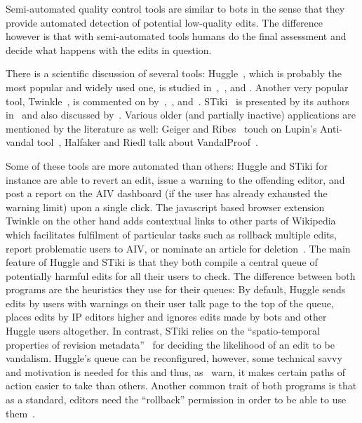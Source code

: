 Semi-automated quality control tools are similar to bots in the sense that they provide automated detection of potential low-quality edits.
The difference however is that with semi-automated tools humans do the final assessment and decide what happens with the edits in question.

There is a scientific discussion of several tools:
Huggle~\cite{Wikipedia:Huggle}, which is probably the most popular and widely used one, is studied in~\cite{GeiHal2013},~\cite{HalRied2012}, and \cite{GeiRib2010}.
Another very popular tool, Twinkle~\cite{Wikipedia:Twinkle}, is commented on by~\cite{GeiHal2013},~\cite{GeiRib2010}, and~\cite{HalGeiMorRied2013}.
STiki~\cite{Wikipedia:STiki} is presented by its authors in~\cite{WestKanLee2010} and also discussed by~\cite{GeiHal2013}.
Various older (and partially inactive) applications are mentioned by the literature as well:
Geiger and Ribes~\cite{GeiRib2010} touch on Lupin's Anti-vandal tool~\cite{Wikipedia:LupinAntiVandal},
Halfaker and Riedl talk about VandalProof~\cite{HalRied2012}.

Some of these tools are more automated than others: Huggle and STiki for instance are able to revert an edit, issue a warning to the offending editor, and post a report on the AIV dashboard (if the user has already exhausted the warning limit) upon a single click.
The javascript based browser extension Twinkle on the other hand adds contextual links to other parts of Wikipedia which facilitates fulfilment of particular tasks such as rollback multiple edits, report problematic users to AIV, or nominate an article for deletion~\cite{GeiRib2010}.
The main feature of Huggle and STiki is that they both compile a central queue of potentially harmful edits for all their users to check.
The difference between both programs are the heuristics they use for their queues:
By default, Huggle sends edits by users with warnings on their user talk page to the top of the queue, places edits by IP editors higher and ignores edits made by bots and other Huggle users altogether\cite{GeiRib2010}.
In contrast, STiki relies on the ``spatio-temporal properties of revision metadata''~\cite{WestKanLee2010} for deciding the likelihood of an edit to be vandalism.
Huggle's queue can be reconfigured, however, some technical savvy and motivation is needed for this and thus, as~\cite{GeiRib2010} warn, it makes certain paths of action easier to take than others.
Another common trait of both programs is that as a standard, editors need the ``rollback'' permission in order to be able to use them~\cite{HalRied2012}. %

